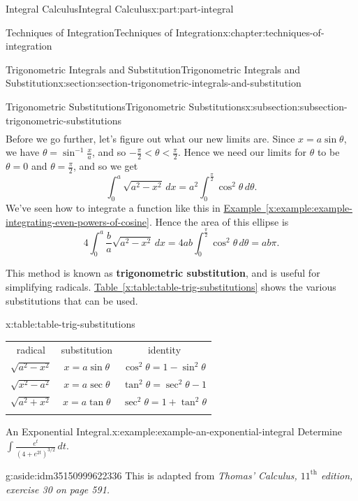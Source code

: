 \documentclass[twoside,10pt,]{tufte-book}
\newcommand{\tabularfont}{\relax}
\newcommand{\xreffont}{\relax}
\newcommand{\terminology}[1]{\textbf{#1}}
\numberwithin{equation}{part}
\newcommand{\hrulethin}  {\noalign{\hrule height 0.04em}}
\newcommand{\hrulethick} {\noalign{\hrule height 0.11em}}
\newcommand{\lt}{<}
\begin{document}
\begin{partptx}{Integral Calculus}{}{Integral Calculus}{}{}{x:part:part-integral}
\begin{chapterptx}{Techniques of Integration}{}{Techniques of Integration}{}{}{x:chapter:techniques-of-integration}
\begin{sectionptx}{Trigonometric Integrals and Substitution}{}{Trigonometric Integrals and Substitution}{}{}{x:section:section-trigonometric-integrals-and-substitution}
\begin{subsectionptx}{Trigonometric Substitutions}{}{Trigonometric Substitutions}{}{}{x:subsection:subsection-trigonometric-substitutions}
\begin{align*}
\end{align*}
Before we go further, let's figure out what our new limits are. Since \(x = a\sin\theta\), we have \(\theta = \sin^{-1}\frac{x}{a}\), and so \(-\frac{\pi}{2} \lt \theta \lt \frac{\pi}{2}\). Hence we need our limits for \(\theta\) to be \(\theta = 0\) and \(\theta = \frac{\pi}{2}\), and so we get%
\begin{equation*}
\int_{0}^{a}\sqrt{a^{2} - x^{2}}\,dx = a^{2}\int_{0}^{\frac{\pi}{2}}\cos^{2}\theta\,d\theta.
\end{equation*}
We've seen how to integrate a function like this in \hyperref[x:example:example-integrating-even-powers-of-cosine]{Example~{\xreffont\ref{x:example:example-integrating-even-powers-of-cosine}}}. Hence the area of this ellipse is%
\begin{equation*}
4\int_{0}^{a}\frac{b}{a}\sqrt{a^{2} - x^{2}}\,dx = 4ab\int_{0}^{\frac{\pi}{2}}\cos^{2}\theta\,d\theta = ab\pi.
\end{equation*}
%
\par
This method is known as \terminology{trigonometric substitution}, and is useful for simplifying radicals. \hyperref[x:table:table-trig-substitutions]{Table~{\xreffont\ref{x:table:table-trig-substitutions}}} shows the various substitutions that can be used.%
\begin{tableptx}{\textbf{}}{x:table:table-trig-substitutions}{}%
\centering%
{\tabularfont%
\begin{tabular}{ccc}\hrulethick
radical&substitution&identity\tabularnewline\hrulethin
\(\sqrt{a^{2} - x^{2}}\)&\(x = a\sin\theta\)&\(\cos^{2}\theta = 1-\sin^{2}\theta\)\tabularnewline[0pt]
\(\sqrt{x^{2} - a^{2}}\)&\(x = a\sec\theta\)&\(\tan^{2}\theta = \sec^{2}\theta - 1\)\tabularnewline[0pt]
\(\sqrt{a^{2} + x^{2}}\)&\(x = a\tan\theta\)&\(\sec^{2}\theta = 1+\tan^{2}\theta\)\tabularnewline\hrulethick
\end{tabular}
}%
\end{tableptx}%
\begin{example}{An Exponential Integral.}{x:example:example-an-exponential-integral}%
Determine \(\displaystyle\int\frac{e^{t}}{(4 + e^{2t})^{3/2}}\,dt.\)%
\begin{aside}{}{g:aside:idm35150999622336}%
This is adapted from \emph{Thomas' Calculus, \(11^{\text{th}}\) edition, exercise 30 on page 591.}%
\end{aside}
\par\smallskip%

\end{example}
\end{subsectionptx}
\end{sectionptx}
\end{chapterptx}
\end{partptx}
\end{document}
